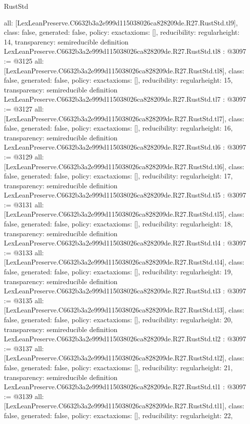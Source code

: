 \begin{lexlean}{RustStd}
\begin{coremodule}
{  all: [LexLeanPreserve.C6632b3a2e999d115038026ca828209de.R27.RustStd.tl9],
  class: false,
  generated: false,
  policy: exact{axioms: []},
  reducibility: regular{height: 14},
  transparency: semireducible
}
definition LexLeanPreserve.C6632b3a2e999d115038026ca828209de.R27.RustStd.tl8 : @3097 := @3125 {
  all: [LexLeanPreserve.C6632b3a2e999d115038026ca828209de.R27.RustStd.tl8],
  class: false,
  generated: false,
  policy: exact{axioms: []},
  reducibility: regular{height: 15},
  transparency: semireducible
}
definition LexLeanPreserve.C6632b3a2e999d115038026ca828209de.R27.RustStd.tl7 : @3097 := @3127 {
  all: [LexLeanPreserve.C6632b3a2e999d115038026ca828209de.R27.RustStd.tl7],
  class: false,
  generated: false,
  policy: exact{axioms: []},
  reducibility: regular{height: 16},
  transparency: semireducible
}
definition LexLeanPreserve.C6632b3a2e999d115038026ca828209de.R27.RustStd.tl6 : @3097 := @3129 {
  all: [LexLeanPreserve.C6632b3a2e999d115038026ca828209de.R27.RustStd.tl6],
  class: false,
  generated: false,
  policy: exact{axioms: []},
  reducibility: regular{height: 17},
  transparency: semireducible
}
definition LexLeanPreserve.C6632b3a2e999d115038026ca828209de.R27.RustStd.tl5 : @3097 := @3131 {
  all: [LexLeanPreserve.C6632b3a2e999d115038026ca828209de.R27.RustStd.tl5],
  class: false,
  generated: false,
  policy: exact{axioms: []},
  reducibility: regular{height: 18},
  transparency: semireducible
}
definition LexLeanPreserve.C6632b3a2e999d115038026ca828209de.R27.RustStd.tl4 : @3097 := @3133 {
  all: [LexLeanPreserve.C6632b3a2e999d115038026ca828209de.R27.RustStd.tl4],
  class: false,
  generated: false,
  policy: exact{axioms: []},
  reducibility: regular{height: 19},
  transparency: semireducible
}
definition LexLeanPreserve.C6632b3a2e999d115038026ca828209de.R27.RustStd.tl3 : @3097 := @3135 {
  all: [LexLeanPreserve.C6632b3a2e999d115038026ca828209de.R27.RustStd.tl3],
  class: false,
  generated: false,
  policy: exact{axioms: []},
  reducibility: regular{height: 20},
  transparency: semireducible
}
definition LexLeanPreserve.C6632b3a2e999d115038026ca828209de.R27.RustStd.tl2 : @3097 := @3137 {
  all: [LexLeanPreserve.C6632b3a2e999d115038026ca828209de.R27.RustStd.tl2],
  class: false,
  generated: false,
  policy: exact{axioms: []},
  reducibility: regular{height: 21},
  transparency: semireducible
}
definition LexLeanPreserve.C6632b3a2e999d115038026ca828209de.R27.RustStd.tl1 : @3097 := @3139 {
  all: [LexLeanPreserve.C6632b3a2e999d115038026ca828209de.R27.RustStd.tl1],
  class: false,
  generated: false,
  policy: exact{axioms: []},
  reducibility: regular{height: 22},
}
\end{coremodule}
\end{lexlean}
